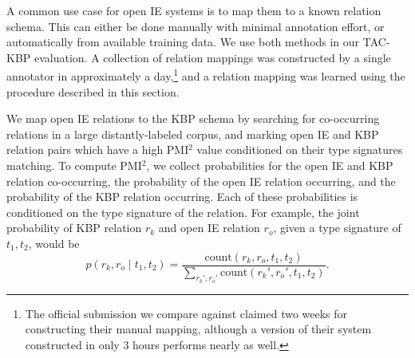 A common use case for open IE systems is to map them to a
  known relation schema.
This can either be done manually with minimal annotation effort, or
  automatically from available training data.
We use both methods in our TAC-KBP evaluation.
A collection of relation mappings was constructed by a single
  annotator in approximately a day,\footnote{
    The official submission we compare against claimed two weeks for constructing
    their manual mapping, although a version of their system constructed in only
    3 hours performs nearly as well.
  } and a relation mapping was learned
  using the procedure described in this section.


We map open IE relations to the KBP schema by searching for co-occurring
  relations in a large distantly-labeled corpus, and marking open IE and
  KBP relation pairs which have a high PMI$^2$ value
  \cite{key:1994dailee-pmisquared,key:2005evert-pmi}
  conditioned on their
  type signatures matching.
To compute PMI$^2$, we collect probabilities for the open IE and KBP
  relation co-occurring, the probability of the open IE relation occurring,
  and the probability of the KBP relation occurring.
Each of these probabilities is conditioned on the type signature of the relation.
For example, the joint probability of KBP relation $r_k$ and open IE relation
  $r_o$, given a type signature of $t_1, t_2$, would be
\begin{equation*}
  p(r_k, r_o \mid t_1, t_2) = \frac{
    \textrm{count}(r_k, r_o,  t_1, t_2)
  }{
    \sum_{r_k', r_o'}\textrm{count}(r_k', r_o', t_1, t_2)
  }.
\end{equation*}

